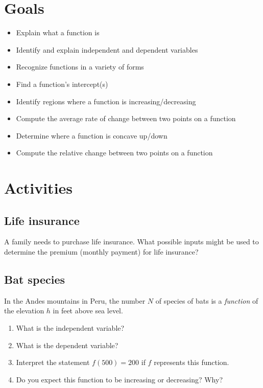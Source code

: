 \documentclass[
]{book}
\providecommand{\tightlist}{%
  \setlength{\itemsep}{0pt}\setlength{\parskip}{0pt}}
\begin{document}
\hypertarget{goals}{%
\section{Goals}\label{goals}}

\begin{itemize}
\tightlist
\item
  Explain what a function is
\item
  Identify and explain independent and dependent variables
\item
  Recognize functions in a variety of forms
\item
  Find a function's intercept(s)
\item
  Identify regions where a function is increasing/decreasing
\item
  Compute the average rate of change between two points on a function
\item
  Determine where a function is concave up/down
\item
  Compute the relative change between two points on a function
\end{itemize}

\hypertarget{activities}{%
\section{Activities}\label{activities}}

\hypertarget{life-insurance}{%
\subsection{Life insurance}\label{life-insurance}}

A family needs to purchase life insurance. What possible inputs might be used to determine the premium (monthly payment) for life insurance?

\hypertarget{bat-species}{%
\subsection{Bat species}\label{bat-species}}

In the Andes mountains in Peru, the number \(N\) of species of bats is a \emph{function} of the elevation \(h\) in feet above sea level.

\begin{enumerate}
\def\labelenumi{\arabic{enumi}.}
\tightlist
\item
  What is the independent variable?
\item
  What is the dependent variable?
\item
  Interpret the statement \(f(500)=200\) if \(f\) represents this function.
\item
  Do you expect this function to be increasing or decreasing? Why?
\end{enumerate}
\end{document}
